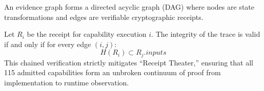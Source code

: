 An evidence graph forms a directed acyclic graph (DAG) where nodes are state transformations and edges are verifiable cryptographic receipts.

Let $R_i$ be the receipt for capability execution $i$. The integrity of the trace is valid if and only if for every edge $(i, j)$:
\[ H(R_i) \subset R_j.inputs \]
This chained verification strictly mitigates ``Receipt Theater,'' ensuring that all 115 admitted capabilities form an unbroken continuum of proof from implementation to runtime observation.
